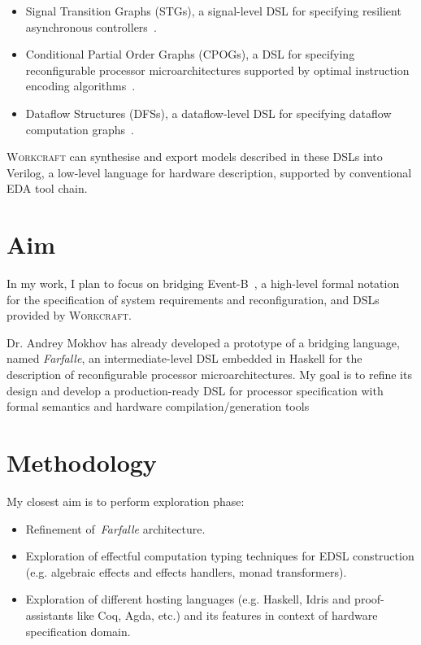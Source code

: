 \documentclass[12pt, a4paper]{article}
\begin{document}
\begin{itemize}
\item Signal Transition Graphs (STGs), a signal-level DSL for
specifying resilient asynchronous controllers~\cite{STG}.
\item Conditional Partial Order Graphs (CPOGs), a DSL for specifying
reconfigurable processor microarchitectures supported by optimal
instruction encoding algorithms~\cite{ISA-formal}.
\item Dataflow Structures (DFSs), a dataflow-level DSL
for specifying dataflow computation graphs~\cite{DFS}.
\end{itemize}

\textsc{Workcraft} can synthesise and export models described in these DSLs into
Verilog, a low-level language for hardware description, supported
by conventional EDA tool chain.

\section*{Aim} 

In my work, I plan to focus on bridging Event-B~\cite{EventB}, 
a high-level formal notation for the specification of system requirements and reconfiguration, and DSLs provided by \textsc{Workcraft}. 

Dr. Andrey Mokhov has already developed a prototype of a bridging language, 
named \emph{Farfalle}, an intermediate-level DSL embedded in Haskell for the description of reconfigurable processor microarchitectures. My goal is to refine
its design and develop a production-ready DSL for processor specification 
with formal semantics and hardware compilation/generation tools  

\section*{Methodology}

My closest aim is to perform exploration phase: 

\begin{itemize} 
\item Refinement of~\emph{Farfalle} architecture.
\item Exploration of effectful computation typing techniques for EDSL
construction (e.g. algebraic effects and effects handlers, monad transformers).
\item Exploration of different hosting languages (e.g. Haskell, Idris and proof-assistants like Coq, Agda, etc.) and its features in context of hardware specification domain.
\end{itemize}
\end{document}
